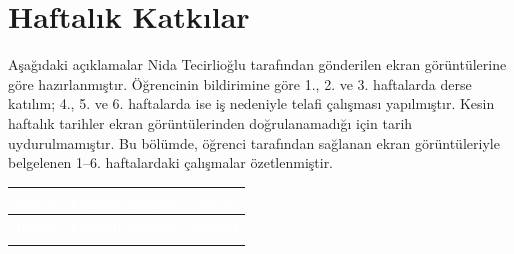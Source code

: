 \documentclass[12pt,a4paper]{article}
\begin{document}
\section{Haftalık Katkılar}
Aşağıdaki açıklamalar Nida Tecirlioğlu tarafından gönderilen ekran görüntülerine göre hazırlanmıştır. Öğrencinin bildirimine göre 1., 2. ve 3. haftalarda derse katılım; 4., 5. ve 6. haftalarda ise iş nedeniyle telafi çalışması yapılmıştır. Kesin haftalık tarihler ekran görüntülerinden doğrulanamadığı için tarih uydurulmamıştır. Bu bölümde, öğrenci tarafından sağlanan ekran görüntüleriyle belgelenen 1--6. haftalardaki çalışmalar özetlenmiştir.

\begin{longtable}{@{}>{\raggedright\arraybackslash}p{1.7cm}%
                    >{\raggedright\arraybackslash}p{6.4cm}%
                    >{\centering\arraybackslash}p{6cm}@{}}
\toprule
\rowcolor{ana}\textcolor{white}{\textbf{Hafta}} & \textcolor{white}{\textbf{Yapılan çalışma}} & \textcolor{white}{\textbf{Görsel}} \\
\midrule
\endfirsthead
\toprule
\rowcolor{ana}\textcolor{white}{\textbf{Hafta}} & \textcolor{white}{\textbf{Yapılan çalışma}} & \textcolor{white}{\textbf{Görsel}} \\
\midrule
\endhead
\bottomrule
\endfoot


\end{longtable}
\end{document}
